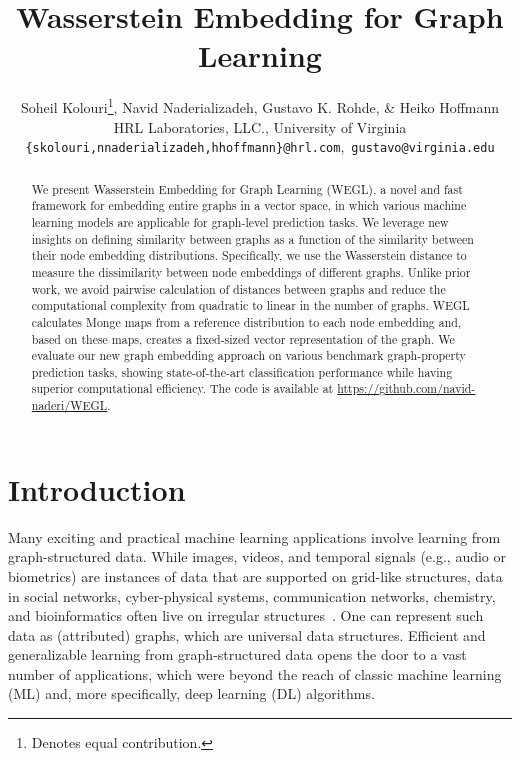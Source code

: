\documentclass[table]{article} \usepackage{iclr2021_conference,times}
\title{Wasserstein Embedding for Graph Learning}
\author{Soheil Kolouri\thanks{Denotes equal contribution.}, Navid Naderializadeh, Gustavo K. Rohde, \& Heiko Hoffmann\\
  HRL Laboratories, LLC., University of Virginia\\
  {\small \texttt{\{skolouri,nnaderializadeh,hhoffmann\}@hrl.com},~\texttt{gustavo@virginia.edu}}\\
}
\begin{document}
\maketitle

\begin{abstract}
We present Wasserstein Embedding for Graph Learning (WEGL), a novel and fast framework for embedding entire graphs in a vector space, in which various machine learning models are applicable for graph-level prediction tasks. We leverage new insights on defining similarity between graphs as a function of the similarity between their node embedding distributions. Specifically, we use the Wasserstein distance to measure the dissimilarity between node embeddings of different graphs. Unlike prior work, we avoid pairwise calculation of distances between graphs and reduce the computational complexity from quadratic to linear in the number of graphs. WEGL calculates Monge maps from a reference distribution to each node embedding and, based on these maps, creates a fixed-sized vector representation of the graph. We evaluate our new graph embedding approach on various benchmark graph-property prediction tasks, showing state-of-the-art classification performance while having superior computational efficiency. The code is available at \url{https://github.com/navid-naderi/WEGL}.
\end{abstract}

\section{Introduction}
Many exciting and practical machine learning applications involve learning from graph-structured data. While images, videos, and temporal signals (e.g., audio or biometrics) are instances of data that are supported on grid-like structures, data in social networks, cyber-physical systems, communication networks, chemistry, and bioinformatics often live on irregular structures~\citep{backstrom2011supervised, sadreazami2017distributed, jin2017predicting, agrawal2018large, naderializadeh2020wireless}. One can represent such data as (attributed) graphs, which are universal data structures. Efficient and generalizable learning from graph-structured data opens the door to a vast number of applications, which were beyond the reach of classic machine learning (ML) and, more specifically, deep learning (DL) algorithms.
\end{document}
